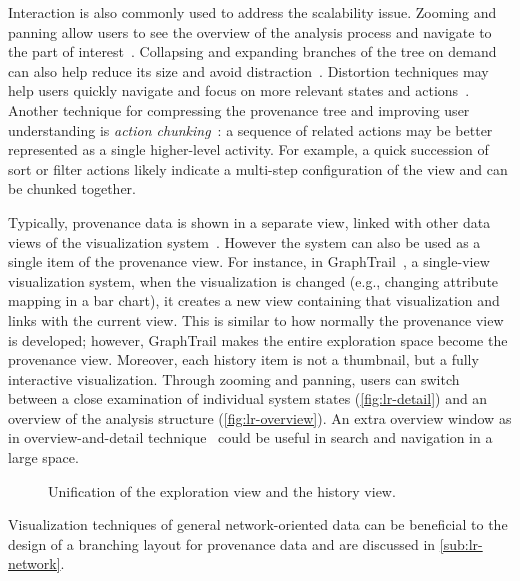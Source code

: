 Interaction is also commonly used to address the scalability issue. Zooming and panning allow users to see the overview of the analysis process and navigate to the part of interest~\cite{Dunne2012}. Collapsing and expanding branches of the tree on demand can also help reduce its size and avoid distraction~\cite{Bavoil2005}. Distortion techniques may help users quickly navigate and focus on more relevant states and actions~\cite{Meng1998}. Another technique for compressing the provenance tree and improving user understanding is \emph{action chunking}~\cite{Heer2008}: a sequence of related actions may be better represented as a single higher-level activity. For example, a quick succession of sort or filter actions likely indicate a multi-step configuration of the view and can be chunked together. 

Typically, provenance data is shown in a separate view, linked with other data views of the visualization system~\cite{Shrinivasan2008,Heer2008,Pike2009,Kadivar2009}. However the system can also be used as a single item of the provenance view. For instance, in GraphTrail~\cite{Dunne2012}, a single-view visualization system, when the visualization is changed (e.g., changing attribute mapping in a bar chart), it creates a new view containing that visualization and links with the current view. This is similar to how normally the provenance view is developed; however, GraphTrail makes the entire exploration space become the provenance view. Moreover, each history item is not a thumbnail, but a fully interactive visualization. Through zooming and panning, users can switch between a close examination of individual system states (\autoref{fig:lr-detail}) and an overview of the analysis structure (\autoref{fig:lr-overview}). An extra overview window as in overview-and-detail technique~\cite{Cockburn2008} could be useful in search and navigation in a large space.

\begin{figure}[!htb]
\centering
{} 
\hfill
{}
\caption{Unification of the exploration view and the history view. }
\end{figure}

Visualization techniques of general network-oriented data can be beneficial to the design of a branching layout for provenance data and are discussed in \autoref{sub:lr-network}.

